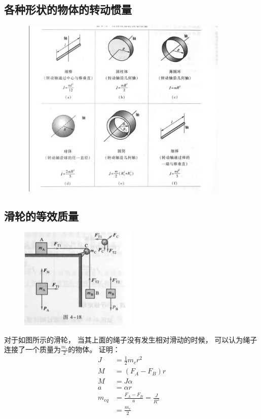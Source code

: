 \documentclass{ctexart}
\begin{document}
\subsection{各种形状的物体的转动惯量}
\begin{figure}[H]
    \centering
    \includegraphics[width=0.9\textwidth]{img/4-2.jpg}
\end{figure}
\subsection{滑轮的等效质量}
\begin{figure}[H]
    \centering
    \includegraphics[width=0.5\textwidth]{img/4-18.jpg}
\end{figure}
对于如图所示的滑轮，
当其上面的绳子没有发生相对滑动的时候，
可以认为绳子连接了一个质量为$\frac{m_c}{2}$的物体。
证明：\\
\begin{align*}
    J       & = \frac{1}{2}m_c r^2                  \\
    M       & = (F_A - F_B)r                        \\
    M       & = J \alpha                            \\
    a       & = \alpha r                            \\
    m_{eq}  & = \frac{F_A - F_B}{a} = \frac{J}{R^2} \\
            & = \frac{m_c}{2}
\end{align*}
\end{document}
